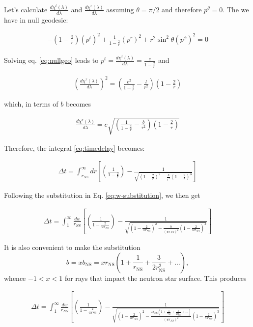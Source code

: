 \documentclass[modern]{aastex631}
\newcommand{\bNS}{b_\mathrm{NS}}
\newcommand{\rNS}{r_\mathrm{NS}}
\begin{document}
Let's calculate $\frac{d\chi^t(\lambda)}{d\lambda}$ and $\frac{d\chi^r(\lambda)}{d\lambda}$ assuming $\theta=\pi/2$ and therefore $p^\theta = 0$. The we have
in null geodesic:
%
\begin{linenomath}\begin{align}
    \label{eq:nullgeo}
    -(1-\frac{2}{r})(p^t)^2 + \frac{1}{1-\frac{2}{r}}(p^r)^2 + r^2\sin^2 \theta (p^\phi)^2 = 0
\end{align}\end{linenomath}
%
Solving eq. \ref{eq:nullgeo} leads to $p^t = \frac{d\chi^t(\lambda)}{d\lambda} = \frac{e}{1-\frac{2}{r}}$ and 
%
\begin{linenomath}\begin{align}
    \label{eq:pr-squared}
    \left(\frac{d\chi^r(\lambda)}{d\lambda}\right)^2 = \left(\frac{e^2}{1-\frac{2}{r}} - \frac{l}{r^2}\right) \left(1-\frac{2}{r}\right)
\end{align}\end{linenomath}
%
which, in terms of $b$ becomes
%
\begin{linenomath}\begin{align}
    \label{eq:pr-b}
    \frac{d\chi^r(\lambda)}{d\lambda} = e\sqrt{\left(\frac{1}{1-\frac{2}{r}} - \frac{b}{r^2}\right) \left(1-\frac{2}{r}\right)}
\end{align}\end{linenomath}
%
Therefore, the integral \ref{eq:timedelay} becomes:
%
\begin{linenomath}\begin{align}
    \label{eq:timedelayfull}
    \Delta t = \int_{r_{NS}}^{\infty} dr \left[\left(\frac{1}{1-\frac{2}{r}}\right) - \frac{1}{\sqrt{\left(1-\frac{2}{r}\right)^2 - \frac{b}{r^2}\left(1-\frac{2}{r}\right)^3}}\right]
\end{align}\end{linenomath}
%
Following the substitution in Eq. \ref{eq:w-substitution}, we then get
%
\begin{linenomath}\begin{align}
    \label{eq:tdelay-with-w}
    \Delta t = \int_{1}^{\infty} \frac{dw}{r_{NS}} \left[\left(\frac{1}{1-\frac{2}{wr_{NS}}}\right) - \frac{1}{\sqrt{\left(1-\frac{2}{wr_{NS}}\right)^2 - \frac{b}{(wr_{NS})^2}\left(1-\frac{2}{wr_{NS}}\right)^3}}\right]
\end{align}\end{linenomath}
%
It is also convenient to make the substitution 
\begin{equation}
    b = x \bNS = x \rNS \left( 1 + \frac{1}{\rNS} + \frac{3}{2 \rNS^2} + \ldots \right),
\end{equation}
whence $-1 < x < 1$ for rays that impact the neutron star surface. This produces 
%
\begin{linenomath}\begin{align}
    \label{eq:tdelay-with-x}
    \Delta t = \int_{1}^{\infty} \frac{dw}{r_{NS}} \left[\left(\frac{1}{1-\frac{2}{wr_{NS}}}\right) - \frac{1}{\sqrt{\left(1-\frac{2}{wr_{NS}}\right)^2 - \frac{x \rNS \left( 1 + \frac{1}{\rNS} + \frac{3}{2 \rNS^2} + \ldots \right)}{(wr_{NS})^2}\left(1-\frac{2}{wr_{NS}}\right)^3}}\right]
\end{align}\end{linenomath}
%

\end{document}
